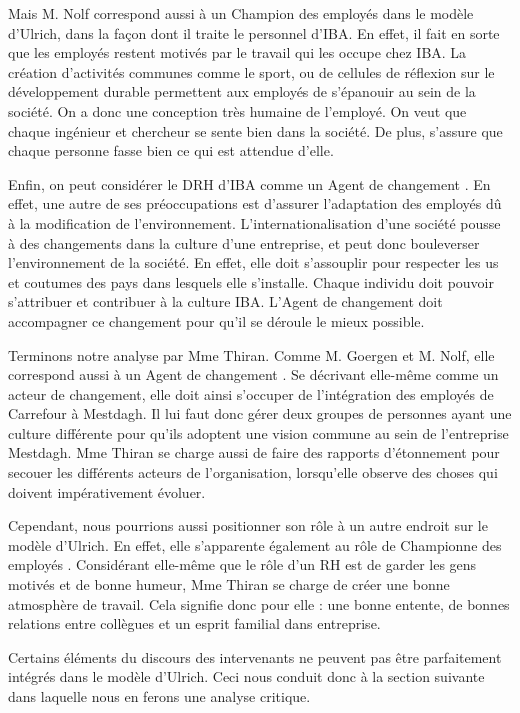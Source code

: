 Mais M. Nolf correspond aussi à un \og Champion des employés \fg{} dans le modèle d'Ulrich, dans la façon dont il traite le personnel d'IBA. En effet, il fait en sorte que les employés restent motivés par le travail qui les occupe chez IBA. La création d'activités communes comme le sport, ou de cellules de réflexion sur le développement durable permettent aux employés de s'épanouir au sein de la société. On a donc une conception très humaine de l'employé. On veut que chaque ingénieur et chercheur se sente bien dans la société. De plus, s'assure que chaque personne fasse bien ce qui est attendue d'elle. \newline

Enfin, on peut considérer le DRH d'IBA comme un \og{} Agent de changement \fg{}. En effet, une autre de ses préoccupations est d'assurer l'adaptation des employés dû à la modification de l'environnement. L'internationalisation d'une société pousse à des changements dans la culture d'une entreprise, et peut donc bouleverser l'environnement de la société. En effet, elle doit s'assouplir pour respecter les us et coutumes des pays dans lesquels elle s'installe. Chaque individu doit pouvoir s'attribuer et contribuer à la culture IBA. L'\og Agent de changement \fg{} doit accompagner ce changement pour qu'il se déroule le mieux possible. \newline

Terminons notre analyse par Mme Thiran. Comme M. Goergen et M. Nolf, elle correspond aussi à un \og Agent de changement \fg{} . Se décrivant elle-même comme un acteur de changement, elle doit ainsi s'occuper de l'intégration des employés de Carrefour à Mestdagh. Il lui faut donc gérer deux groupes de personnes ayant une culture différente pour qu'ils adoptent une vision commune au sein de l'entreprise Mestdagh. Mme Thiran se charge aussi de faire des rapports d'étonnement pour \og secouer \fg{} les différents acteurs de l'organisation, lorsqu'elle observe des choses qui doivent impérativement évoluer.\newline

Cependant, nous pourrions aussi positionner son rôle à un autre endroit sur le modèle d'Ulrich. En effet, elle s'apparente également au rôle de \og Championne des employés \fg{}. Considérant elle-même que le rôle d'un RH est de garder les gens motivés et de bonne humeur, Mme Thiran se charge de créer une bonne atmosphère de travail. Cela signifie donc pour elle : une bonne entente, de bonnes relations entre collègues et un esprit familial dans entreprise. 

Certains éléments du discours des intervenants ne peuvent pas être parfaitement intégrés dans le modèle d'Ulrich. Ceci nous conduit donc à la section suivante dans laquelle nous en ferons une analyse critique.
